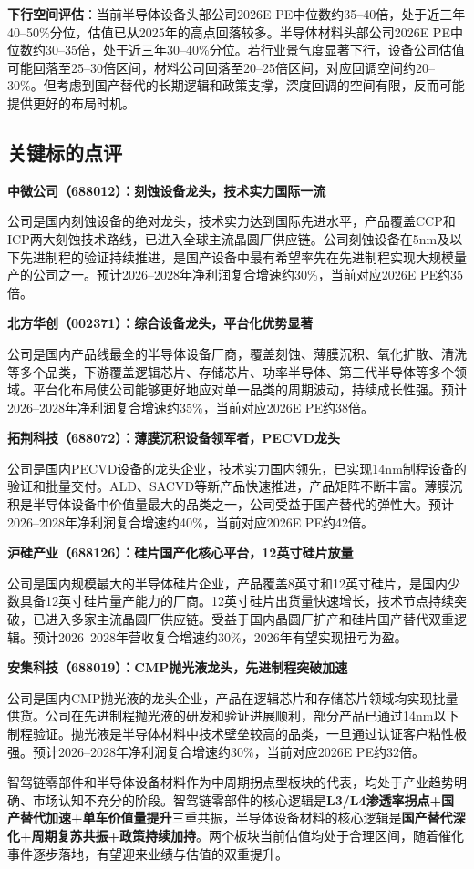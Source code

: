 \textbf{下行空间评估}：当前半导体设备头部公司2026E PE中位数约35--40倍，处于近三年40--50\%分位，估值已从2025年的高点回落较多。半导体材料头部公司2026E PE中位数约30--35倍，处于近三年30--40\%分位。若行业景气度显著下行，设备公司估值可能回落至25--30倍区间，材料公司回落至20--25倍区间，对应回调空间约20--30\%。但考虑到国产替代的长期逻辑和政策支撑，深度回调的空间有限，反而可能提供更好的布局时机。

\subsection{关键标的点评}

\textbf{中微公司（688012）：刻蚀设备龙头，技术实力国际一流}

公司是国内刻蚀设备的绝对龙头，技术实力达到国际先进水平，产品覆盖CCP和ICP两大刻蚀技术路线，已进入全球主流晶圆厂供应链。公司刻蚀设备在5nm及以下先进制程的验证持续推进，是国产设备中最有希望率先在先进制程实现大规模量产的公司之一。预计2026--2028年净利润复合增速约30\%，当前对应2026E PE约35倍。

\textbf{北方华创（002371）：综合设备龙头，平台化优势显著}

公司是国内产品线最全的半导体设备厂商，覆盖刻蚀、薄膜沉积、氧化扩散、清洗等多个品类，下游覆盖逻辑芯片、存储芯片、功率半导体、第三代半导体等多个领域。平台化布局使公司能够更好地应对单一品类的周期波动，持续成长性强。预计2026--2028年净利润复合增速约35\%，当前对应2026E PE约38倍。

\textbf{拓荆科技（688072）：薄膜沉积设备领军者，PECVD龙头}

公司是国内PECVD设备的龙头企业，技术实力国内领先，已实现14nm制程设备的验证和批量交付。ALD、SACVD等新产品快速推进，产品矩阵不断丰富。薄膜沉积是半导体设备中价值量最大的品类之一，公司受益于国产替代的弹性大。预计2026--2028年净利润复合增速约40\%，当前对应2026E PE约42倍。

\textbf{沪硅产业（688126）：硅片国产化核心平台，12英寸硅片放量}

公司是国内规模最大的半导体硅片企业，产品覆盖8英寸和12英寸硅片，是国内少数具备12英寸硅片量产能力的厂商。12英寸硅片出货量快速增长，技术节点持续突破，已进入多家主流晶圆厂供应链。受益于国内晶圆厂扩产和硅片国产替代双重逻辑。预计2026--2028年营收复合增速约30\%，2026年有望实现扭亏为盈。

\textbf{安集科技（688019）：CMP抛光液龙头，先进制程突破加速}

公司是国内CMP抛光液的龙头企业，产品在逻辑芯片和存储芯片领域均实现批量供货。公司在先进制程抛光液的研发和验证进展顺利，部分产品已通过14nm以下制程验证。抛光液是半导体材料中技术壁垒较高的品类，一旦通过认证客户粘性极强。预计2026--2028年净利润复合增速约30\%，当前对应2026E PE约32倍。

\begin{keyinsight}[本章小结]
智驾链零部件和半导体设备材料作为中周期拐点型板块的代表，均处于产业趋势明确、市场认知不充分的阶段。智驾链零部件的核心逻辑是\textbf{L3/L4渗透率拐点+国产替代加速+单车价值量提升}三重共振，半导体设备材料的核心逻辑是\textbf{国产替代深化+周期复苏共振+政策持续加持}。两个板块当前估值均处于合理区间，随着催化事件逐步落地，有望迎来业绩与估值的双重提升。
\end{keyinsight}
